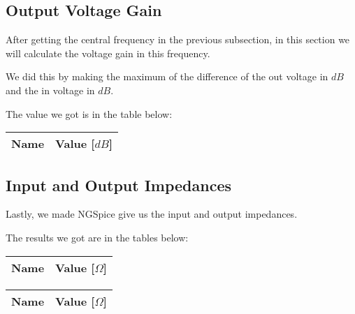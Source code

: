 \subsection{Output Voltage Gain}
After getting the central frequency in the previous subsection, in this section we will calculate the voltage gain in this frequency. \par
We did this by making the maximum of the difference of the out voltage in $dB$ and the in voltage in $dB$. \par
The value we got is in the table below:

\begin{table}[H]
  \centering
  \begin{tabular}{|l|r|}
    \hline    
    {\bf Name} & {\bf Value [$dB$]} \\ \hline
    
  \end{tabular}
  \label{tab:vgain}
\end{table}

\subsection{Input and Output Impedances}
Lastly, we made NGSpice give us the input and output impedances. \par
The results we got are in the tables below: 

\begin{table}[H]
  \centering
  \begin{tabular}{|l|r|}
    \hline    
    {\bf Name} & {\bf Value [$\Omega$]} \\ \hline
    
  \end{tabular}
  \label{tab:inimpedance}
\end{table}

\begin{table}[H]
  \centering
  \begin{tabular}{|l|r|}
    \hline    
    {\bf Name} & {\bf Value [$\Omega$]} \\ \hline
    
  \end{tabular}
  \label{tab:outimpedance}
\end{table}




